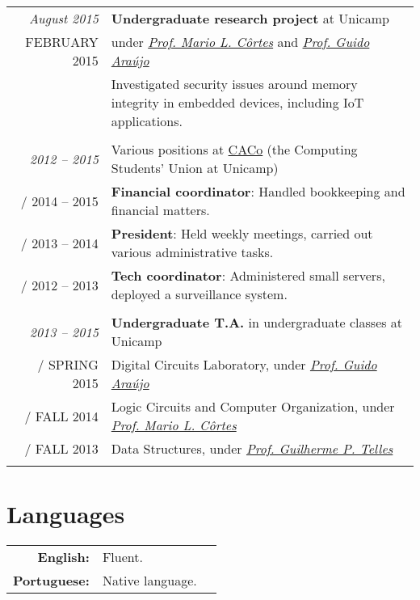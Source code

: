 \documentclass[a4paper,10pt]{article}
\makeatletter
\def\fakesc#1{%
  \begingroup%
  \xdef\fake@name{\csname\curr@fontshape/\f@size\endcsname}%
  \fontsize{\fontdimen8\fake@name}{\baselineskip}\selectfont%
  \uppercase{#1}%
  \endgroup%
}
\renewcommand{\textsc}{\fakesc}
\makeatother
\begin{document}
\begin{tabular}{r|p{11cm}}

    \emph{August 2015} & \textbf{Undergraduate research project} at Unicamp\\
  \textsc{February 2015} & under \href{http://www.ic.unicamp.br/~cortes/}{\emph{Prof. Mario L. Côrtes}} and \href{http://guidoaraujo.wordpress.com/}{\emph{Prof. Guido Araújo}}\\
                 & \footnotesize {Investigated security issues around memory integrity in embedded devices, including IoT applications.}\\
  \multicolumn{2}{c}{} \\

  \emph{2012 -- 2015} & Various positions at \href{http://www.caco.ic.unicamp.br}{CACo} \footnotesize{(the Computing Students' Union at Unicamp)} \\
  \textsc{2014 -- 2015} & \footnotesize{\textbf{Financial coordinator}: Handled bookkeeping and financial matters.}\\
  \textsc{2013 -- 2014} & \footnotesize{\textbf{President}: Held weekly meetings, carried out various administrative tasks.}\\
  \textsc{2012 -- 2013} & \footnotesize{\textbf{Tech coordinator}: Administered small servers, deployed a surveillance system.}\\
  \multicolumn{2}{c}{} \\

  \emph{2013 -- 2015} & \textbf{Undergraduate T.A.} in undergraduate classes at Unicamp \\
  \textsc{Spring 2015} & \footnotesize{Digital Circuits Laboratory, under \href{http://guidoaraujo.wordpress.com/}{\emph{Prof. Guido Araújo}}}\\
  \textsc{Fall 2014} & \footnotesize{Logic Circuits and Computer Organization, under \href{http://www.ic.unicamp.br/~cortes/}{\emph{Prof. Mario L. Côrtes}}}\\
  \textsc{Fall 2013} & \footnotesize{Data Structures, under \href{http://ic.unicamp.br/~gpt/}{\emph{Prof. Guilherme P. Telles}}}\\
  \multicolumn{2}{c}{}\\

\end{tabular}

 \section{Languages}

 \begin{tabularx}{\textwidth}{rXr}
   \textbf{English:} & Fluent. \\
   \textbf{Portuguese:} & Native language.\\
 \end{tabularx}
\end{document}
